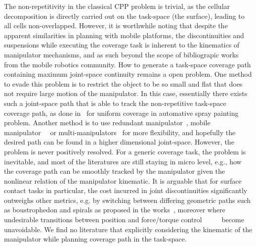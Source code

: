 \documentclass[Afour,sageh,times]{sagej}
\begin{document}
The non-repetitivity in the classical CPP problem is trivial, as the cellular decomposition is directly carried out on the task-space (the surface), leading to all cells non-overlapped. However, it is worthwhile noting that despite the apparent similarities in planning with mobile platforms, the discontinuities and suspensions while executing the coverage task is inherent to the kinematics of manipulator mechanisms, and as such beyond the scope of bibliograpic works from the mobile robotics community. How to generate a task-space coverage path containing maximum joint-space continuity remains a open problem.
One method to evade this problem is to restrict the object to be so small and flat that does not require large motion of the manipulator. In this case, essentially there exists such a joint-space path that is able to track the non-repetitive task-space coverage path, as done in~\cite{Atkar2008Hierarchical} for uniform coverage in automative spray painting problem. 
Another method is to use redundant manipulator~\cite{Hess2012Null}, mobile manipulator~\cite{Atkar2003Towards}~\cite{Ren2017A} or multi-manipulators~\cite{Hassan2016Modeling} for more flexibility, and hopefully the desired path can be found in a higher dimensional joint-space. 
However, the problem is never positively resolved. 
For a generic coverage task, the problem is inevitable, and most of the literatures are still staying in micro level, e.g., how the coverage path can be smoothly tracked by the manipulator given the nonlinear relation of the manipulator kinematic.
It is arguable that for surface contact tasks in particular, the cost incurred in joint discontinuities significantly 
outweighs other metrics, e.g. by switching between differing geometric paths such as boustrophedon and spirals as proposed in the works~\cite{Hassan2018A}, moreover where undesirable transitions between position and force/torque control~\cite{cheah2003brief}~\cite{heck2015switched}~\cite{mirrazavi2018a}~\cite{solanes2018adaptive}~\cite{Solanes2018Robust} become unavoidable.
%
%
%
We find no literature that explicitly considering the kinematic of the manipulator while planning coverage path in the task-space. 
\end{document}
